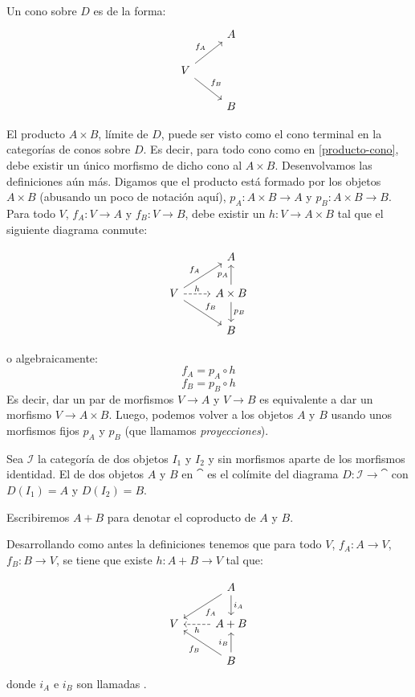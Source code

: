 Un cono sobre $D$ es de la forma:
\begin{equation}\label{producto-cono} \begin{tikzcd}
 & A\\
V \arrow[ur,"f_A"] \arrow[dr,"f_B"]\\
 & B
\end{tikzcd} \end{equation}

El producto $A \times B$, límite de $D$, puede ser visto como el cono terminal en la categorías de conos sobre $D$.
Es decir, para todo cono como en \ref{producto-cono}, debe existir un único morfismo de dicho cono al $A \times B$.
Desenvolvamos las definiciones aún más.
Digamos que el producto está formado por los objetos $A \times B$ (abusando un poco de notación aquí), $p_A \colon A \times B \to A$ y $p_B \colon A \times B \to B$.
Para todo $V$, $f_A \colon V \to A$ y $f_B \colon V \to B$, debe existir un $h \colon V \to A \times B$ tal que el siguiente diagrama conmute:

\[\begin{tikzcd}
 & A\\
V \arrow[ur,"f_A"] \arrow[dr,"f_B"] \arrow[r,dashed,"h"] & A \times B \arrow[u,"p_A"] \arrow[d,"p_B"]\\
 & B
\end{tikzcd}\]

o algebraicamente:
\[ f_A = p_A \circ h \]
\[ f_B = p_B \circ h \]
Es decir, dar un par de morfismos $V \to A$ y $V \to B$ es equivalente a dar un morfismo $V \to A \times B$.
Luego, podemos volver a los objetos $A$ y $B$ usando unos morfismos fijos $p_A$ y $p_B$ (que llamamos \emph{proyecciones}).

\begin{definition}
Sea $\mathcal{I}$ la categoría de dos objetos $I_1$ y $I_2$ y sin morfismos aparte de los morfismos identidad. El  de dos objetos $A$ y $B$ en $\cat$ es el colímite del diagrama $D \colon \mathcal{I} \to \cat$ con $D(I_1) = A$ y $D(I_2) = B$.

Escribiremos $A + B$ para denotar el coproducto de $A$ y $B$.
\end{definition}

Desarrollando como antes la definiciones tenemos que para todo $V$, $f_A \colon A \to V$, $f_B \colon B \to V$, se tiene que existe $h \colon A + B \to V$ tal que:

\[\begin{tikzcd}
 & A \arrow[dl,"f_A"] \arrow[d,"i_A"]\\
V & A + B \arrow[l,dashed,"h"]\\
 & B \arrow[ul,"f_B"] \arrow[u,"i_B"]
\end{tikzcd}\]
donde $i_A$ e $i_B$ son llamadas .

